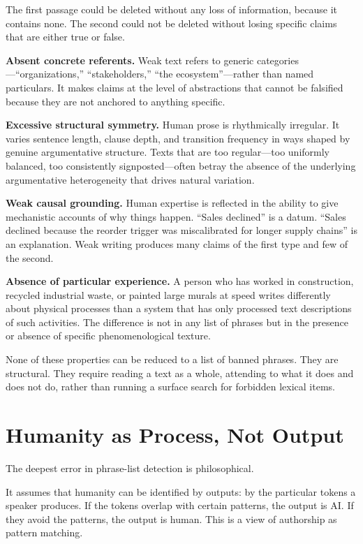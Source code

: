 \documentclass[12pt]{article}
\begin{document}
The first passage could be deleted without any loss of information, because it contains none. The second could not be deleted without losing specific claims that are either true or false.

\textbf{Absent concrete referents.} Weak text refers to generic categories---``organizations,'' ``stakeholders,'' ``the ecosystem''---rather than named particulars. It makes claims at the level of abstractions that cannot be falsified because they are not anchored to anything specific.

\textbf{Excessive structural symmetry.} Human prose is rhythmically irregular. It varies sentence length, clause depth, and transition frequency in ways shaped by genuine argumentative structure. Texts that are too regular---too uniformly balanced, too consistently signposted---often betray the absence of the underlying argumentative heterogeneity that drives natural variation.

\textbf{Weak causal grounding.} Human expertise is reflected in the ability to give mechanistic accounts of why things happen. ``Sales declined'' is a datum. ``Sales declined because the reorder trigger was miscalibrated for longer supply chains'' is an explanation. Weak writing produces many claims of the first type and few of the second.

\textbf{Absence of particular experience.} A person who has worked in construction, recycled industrial waste, or painted large murals at speed writes differently about physical processes than a system that has only processed text descriptions of such activities. The difference is not in any list of phrases but in the presence or absence of specific phenomenological texture.

None of these properties can be reduced to a list of banned phrases. They are structural. They require reading a text as a whole, attending to what it does and does not do, rather than running a surface search for forbidden lexical items.

\section{Humanity as Process, Not Output}

The deepest error in phrase-list detection is philosophical.

It assumes that humanity can be identified by outputs: by the particular tokens a speaker produces. If the tokens overlap with certain patterns, the output is AI. If they avoid the patterns, the output is human. This is a view of authorship as pattern matching.
\end{document}
